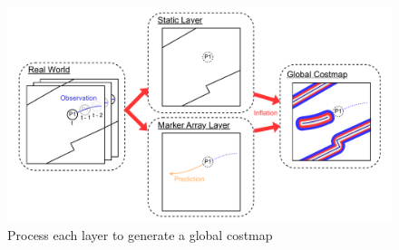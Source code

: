 \vspace{-25pt}

\begin{figure}[H]
  \centering
 \includegraphics[keepaspectratio, scale=0.45]
      {images/costmap-image.pdf}
\caption{Process each layer to generate a global costmap}
 \label{Fig:costmap-flow}
\end{figure} 


\newpage
